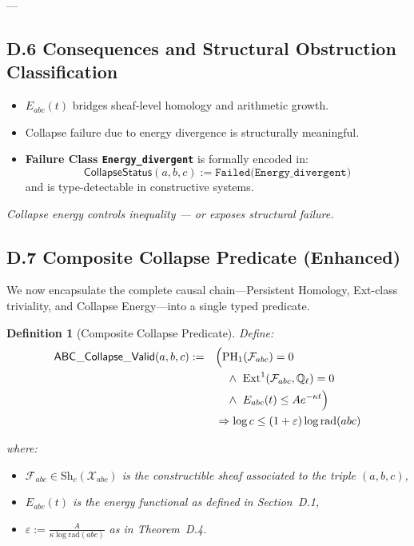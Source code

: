 \documentclass[11pt]{article}
\newtheorem{mydefinition}{Definition}
\begin{document}
---

\subsection*{D.6 Consequences and Structural Obstruction Classification}

\begin{itemize}
  \item \( E_{abc}(t) \) bridges sheaf-level homology and arithmetic growth.
  \item Collapse failure due to energy divergence is structurally meaningful.
  \item \textbf{Failure Class \texttt{Energy\_divergent}} is formally encoded in:
  \[
  \mathsf{CollapseStatus}(a,b,c) := \texttt{Failed(Energy\_divergent)}
  \]
  and is type-detectable in constructive systems.
\end{itemize}

\begin{center}
\textit{Collapse energy controls inequality — or exposes structural failure.}
\end{center}


\subsection*{D.7 Composite Collapse Predicate (Enhanced)}

We now encapsulate the complete causal chain—Persistent Homology, Ext-class triviality, and Collapse Energy—into a single typed predicate.

\begin{mydefinition}[Composite Collapse Predicate]
Define:
\begin{align*}
\mathsf{ABC\_Collapse\_Valid}(a,b,c) := \quad &
  \Bigl(
    \mathrm{PH}_1(\mathcal{F}_{abc}) = 0 \\
    &\quad \wedge\ \mathrm{Ext}^1(\mathcal{F}_{abc}, \mathbb{Q}_\ell) = 0 \\
    &\quad \wedge\ E_{abc}(t) \leq A e^{-\kappa t}
  \Bigr) \\
  &\Rightarrow \log c \leq (1+\varepsilon)\log \mathrm{rad}(abc)
\end{align*}

where:
\begin{itemize}
  \item \( \mathcal{F}_{abc} \in \mathrm{Sh}_c(\mathcal{X}_{abc}) \) is the constructible sheaf associated to the triple \( (a,b,c) \),
  \item \( E_{abc}(t) \) is the energy functional as defined in Section~D.1,
  \item \( \varepsilon := \frac{A}{\kappa \log \mathrm{rad}(abc)} \) as in Theorem~D.4.
\end{itemize}
\end{mydefinition}
\end{document}
